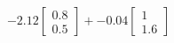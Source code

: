 \documentclass[preview]{standalone}
\begin{document}
\begin{align*}
-2.12 \begin{bmatrix} 0.8 \\ 0.5 \end{bmatrix} + -0.04 \begin{bmatrix} 1 \\ 1.6 \end{bmatrix}
\end{align*}
\end{document}
